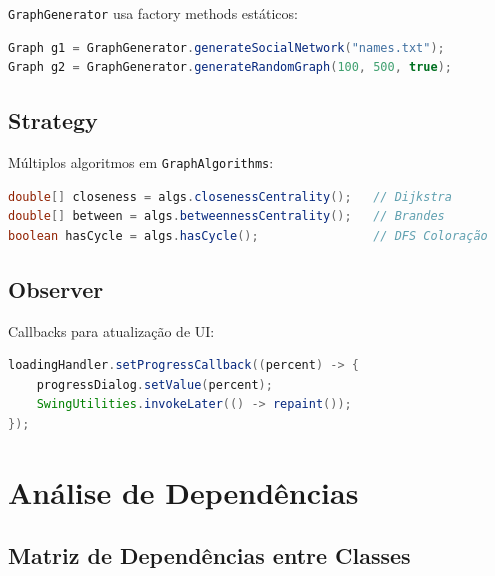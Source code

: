 \documentclass[12pt,a4paper]{article}
\begin{document}
    \texttt{GraphGenerator} usa factory methods estáticos:

    \begin{lstlisting}[language=Java, caption=Factory Pattern]
Graph g1 = GraphGenerator.generateSocialNetwork("names.txt");
Graph g2 = GraphGenerator.generateRandomGraph(100, 500, true);
    \end{lstlisting}

    \subsection{Strategy}

    Múltiplos algoritmos em \texttt{GraphAlgorithms}:

    \begin{lstlisting}[language=Java, caption=Strategy Pattern]
double[] closeness = algs.closenessCentrality();   // Dijkstra
double[] between = algs.betweennessCentrality();   // Brandes
boolean hasCycle = algs.hasCycle();                // DFS Coloração
    \end{lstlisting}

    \subsection{Observer}

    Callbacks para atualização de UI:

    \begin{lstlisting}[language=Java, caption=Observer Pattern]
loadingHandler.setProgressCallback((percent) -> {
    progressDialog.setValue(percent);
    SwingUtilities.invokeLater(() -> repaint());
});
    \end{lstlisting}

    \newpage

    \section{Análise de Dependências}

    \subsection{Matriz de Dependências entre Classes}
\end{document}
